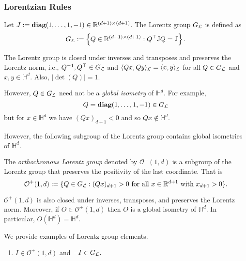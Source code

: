 \documentclass[twoside,11pt]{article}
\begin{document}
\subsubsection{Lorentzian Rules}
\begin{definition}
Let $J := \textbf{diag}(1, \ldots, 1, -1) \in \mathbb{R}^{(d+1) \times (d+1)}$. The Lorentz group $G_{\mathcal{L}}$ is defined as 
\[
G_{\mathcal{L}}:=\left\{Q \in \mathbb{R}^{(d+1) \times(d+1)}: Q^{\top} \mathrm{J} Q=\mathrm{J}\right\} .
\]

\begin{remark}\label{remark:lorentz_group}
    The Lorentz group is closed under inverses and transposes and preserves the Lorentz norm, i.e., $Q^{-1}, Q^\top \in G_{\mathcal{L}}$ and $\langle Qx,Qy \rangle_{\mathcal{L}} = \langle x,y \rangle_{\mathcal{L}}$ for all $Q \in G_{\mathcal{L}}$ and $x,y \in \mathbb{H}^d$. Also, $|\det (Q)| = 1$. 
\end{remark}

However, $Q \in G_{\mathcal{L}}$ need not be a \emph{global isometry} of $\mathbb{H}^d$. For example, 
    \[
    Q = \textbf{diag}(1, \ldots, 1, -1) \in G_{\mathcal{L}}
    \]
    but for $x \in \mathbb{H}^d$ we have $(Qx)_{d+1} < 0$ and so $Qx \notin \mathbb{H}^d$.

However, the following subgroup of the Lorentz group contains global isometries of $\mathbb{H}^d$.

\begin{definition}
The \emph{orthochronous Lorentz group} denoted by $\mathcal{O}^+(1,d)$ is a subgroup of the Lorentz group that preserves the positivity of the last coordinate. That is 
\[
\mathcal{O}^+(1,d) := \{Q \in G_{\mathcal{L}}: (Qx)_{d+1} > 0 \text{ for all } x \in \mathbb{R}^{d+1} \text{ with } x_{d+1} > 0\}.
\]
    
\end{definition}




\begin{remark}
    $\mathcal{O}^+(1,d)$ is also closed under inverses, transposes, and preserves the Lorentz norm. Moreover, if $O \in \mathcal{O}^+(1,d)$ then $O$ is a global isometry of $\mathbb{H}^d$. In particular, $O(\mathbb{H}^d) = \mathbb{H}^d.$
\end{remark}



\begin{example}
We provide examples of Lorentz group elements. 
\begin{enumerate}
    \item $I \in \mathcal{O}^{+}(1,d)$ and $-I \in G_{\mathcal{L}}.$
   

\end{enumerate}
\end{example}
\end{definition}
\end{document}
